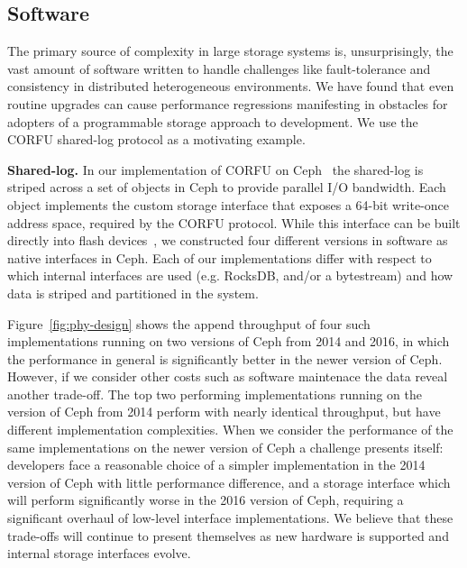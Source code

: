 \subsection{Software}

The primary source of complexity in large storage systems is, unsurprisingly,
the vast amount of software written to handle challenges like fault-tolerance
and consistency in distributed heterogeneous environments. We have found that
even routine upgrades can cause performance regressions manifesting in obstacles 
for adopters of a programmable storage approach to development. We use the
CORFU shared-log protocol as a motivating example.

{\bf Shared-log.} In our implementation of CORFU on Ceph~\cite{zlog} the shared-log is striped
across a set of objects in Ceph to provide parallel I/O bandwidth. Each object
implements the custom storage interface that exposes a 64-bit write-once address
space, required by the CORFU protocol.  While this interface can be
built directly into flash devices~\cite{wei:systor13}, we constructed four
different versions in software as native interfaces in Ceph. Each of our
implementations differ with respect to which internal interfaces are used
(e.g. RocksDB, and/or a bytestream) and how data is striped and partitioned in the system.

Figure~\ref{fig:phy-design} shows the append throughput of four such
implementations running on two versions of Ceph from 2014 and 2016, in which
the performance in general is significantly better in the newer version of
Ceph. However, if we consider other costs such as software maintenace the data
reveal another trade-off. The top two performing implementations running on
the version of Ceph from 2014 perform with nearly identical throughput, but
have different implementation complexities. When we consider the performance
of the same implementations on the newer version of Ceph a challenge presents
itself: developers face a reasonable choice of a simpler implementation in the
2014 version of Ceph with little performance difference, and a storage
interface which will perform significantly worse in the 2016 version of Ceph,
requiring a significant overhaul of low-level interface implementations. We
believe that these trade-offs will continue to present themselves as new
hardware is supported and internal storage interfaces evolve.

